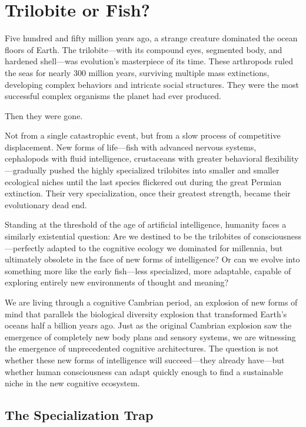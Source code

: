 \chapter{Trilobite or Fish?}

Five hundred and fifty million years ago, a strange creature dominated the ocean floors of Earth. The trilobite—with its compound eyes, segmented body, and hardened shell—was evolution's masterpiece of its time. These arthropods ruled the seas for nearly 300 million years, surviving multiple mass extinctions, developing complex behaviors and intricate social structures. They were the most successful complex organisms the planet had ever produced.

Then they were gone.

Not from a single catastrophic event, but from a slow process of competitive displacement. New forms of life—fish with advanced nervous systems, cephalopods with fluid intelligence, crustaceans with greater behavioral flexibility—gradually pushed the highly specialized trilobites into smaller and smaller ecological niches until the last species flickered out during the great Permian extinction. Their very specialization, once their greatest strength, became their evolutionary dead end.

Standing at the threshold of the age of artificial intelligence, humanity faces a similarly existential question: Are we destined to be the trilobites of consciousness—perfectly adapted to the cognitive ecology we dominated for millennia, but ultimately obsolete in the face of new forms of intelligence? Or can we evolve into something more like the early fish—less specialized, more adaptable, capable of exploring entirely new environments of thought and meaning?

We are living through a cognitive Cambrian period, an explosion of new forms of mind that parallels the biological diversity explosion that transformed Earth's oceans half a billion years ago. Just as the original Cambrian explosion saw the emergence of completely new body plans and sensory systems, we are witnessing the emergence of unprecedented cognitive architectures. The question is not whether these new forms of intelligence will succeed—they already have—but whether human consciousness can adapt quickly enough to find a sustainable niche in the new cognitive ecosystem.

\section{The Specialization Trap}

